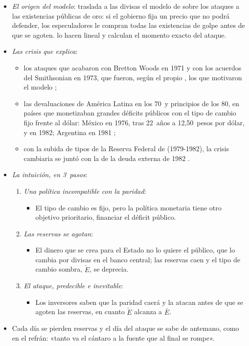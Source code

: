 \documentclass[11pt]{article}
\begin{document}
\begin{itemize}
\item \emph{El origen del modelo}: \textcite{Krugman1979Model} traslada a las divisas el modelo de \textcite{SalantHenderson1978} sobre los ataques a las existencias públicas de oro: si el gobierno fija un precio que no podrá defender, los especuladores le compran todas las existencias de golpe antes de que se agoten. \textcite{FloodGarber1984} lo hacen lineal y calculan el momento exacto del ataque.
\item \emph{Las crisis que explica}:
  \begin{itemize}
  \item los ataques que acabaron con Bretton Woods en 1971 y con los acuerdos del Smithsonian en 1973, que fueron, según el propio , los que motivaron el modelo\nocite{Krugman2001Next} ;
  \item las devaluaciones de América Latina en los 70~y principios de los 80, en países que monetizaban grandes déficits públicos con el tipo de cambio fijo frente al dólar: México en 1976, tras 22~años a 12,50~pesos por dólar, y en 1982; Argentina en 1981\nocite{BlancoGarber1986,CumbyVanWijnbergen1989Financial} ;
  \item con la subida de tipos de la Reserva Federal de  (1979-1982), la crisis cambiaria se juntó con la de la deuda externa de 1982 .
  \end{itemize}
\item \emph{La intuición, en 3~pasos}:
  \begin{enumerate}
  \item \emph{Una política incompatible con la paridad}:
    \begin{itemize}
    \item El tipo de cambio es fijo, pero la política monetaria tiene otro objetivo prioritario, financiar el déficit público.
    \end{itemize}
  \item \emph{Las reservas se agotan}:
    \begin{itemize}
    \item El dinero que se crea para el Estado no lo quiere el público, que lo cambia por divisas en el banco central; las reservas caen y el tipo de cambio sombra, $\tilde E$, se deprecia.
    \end{itemize}
  \item \emph{El ataque, predecible e inevitable}:
    \begin{itemize}
    \item Los inversores saben que la paridad caerá y la atacan antes de que se agoten las reservas, en cuanto $\tilde E$ alcanza a $\bar E$.
    \end{itemize}
  \end{enumerate}
\item Cada día se pierden reservas y el día del ataque se sabe de antemano, como en el refrán: «tanto va el cántaro a la fuente que al final se rompe».
\end{itemize}
\end{document}
